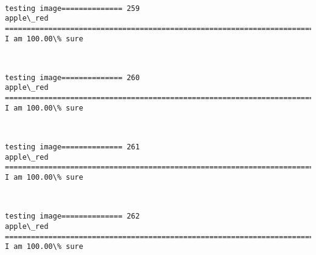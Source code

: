 \documentclass[11pt]{article}
\begin{document}
    \begin{center}
    \end{center}
    { \hspace*{\fill} \\}
    
    \begin{Verbatim}[commandchars=\\\{\}]
testing image============== 259
apple\_red
============================================================================
I am 100.00\% sure

    \end{Verbatim}

    \begin{center}
    \end{center}
    { \hspace*{\fill} \\}
    
    \begin{Verbatim}[commandchars=\\\{\}]
testing image============== 260
apple\_red
============================================================================
I am 100.00\% sure

    \end{Verbatim}

    \begin{center}
    \end{center}
    { \hspace*{\fill} \\}
    
    \begin{Verbatim}[commandchars=\\\{\}]
testing image============== 261
apple\_red
============================================================================
I am 100.00\% sure

    \end{Verbatim}

    \begin{center}
    \end{center}
    { \hspace*{\fill} \\}
    
    \begin{Verbatim}[commandchars=\\\{\}]
testing image============== 262
apple\_red
============================================================================
I am 100.00\% sure

    \end{Verbatim}
\end{document}
